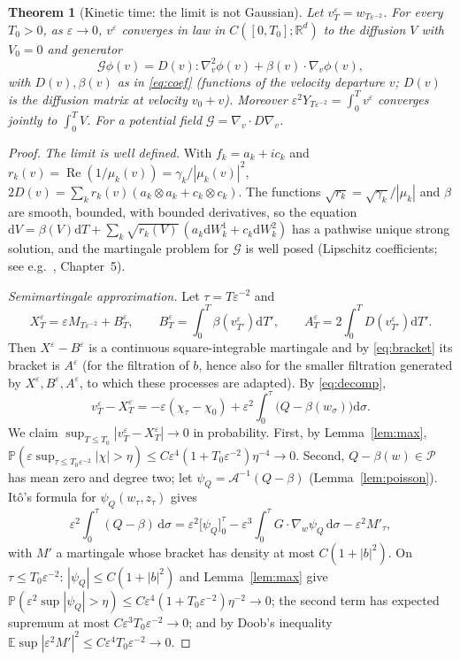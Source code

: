 \documentclass[11pt]{article}
\newcommand{\dd}{\mathrm{d}}
\newcommand{\E}{\mathbb{E}}
\newcommand{\eps}{\varepsilon}
\newcommand{\cA}{\mathcal{A}}
\newcommand{\cP}{\mathcal{P}}
\renewcommand{\Re}{\operatorname{Re}}
\newtheorem{theorem}{Theorem}
\theoremstyle{remark}
\begin{document}
\begin{theorem}[Kinetic time: the limit is not Gaussian]\label{thm:kinetic}
Let $v^\eps_T = w_{T\eps^{-2}}$. For every $T_0>0$, as $\eps\to0$, $v^\eps$
converges in law in $C([0,T_0];\mathbb{R}^d)$ to the diffusion $V$ with
$V_0=0$ and generator
\[
  \mathcal{G}\phi(v) = D(v):\nabla_v^2\phi(v) + \beta(v)\cdot\nabla_v\phi(v),
\]
with $D(v),\beta(v)$ as in \eqref{eq:coef} (functions of the velocity
departure $v$; $D(v)$ is the diffusion matrix at velocity $v_0+v$). Moreover
$\eps^2Y_{T\eps^{-2}} = \int_0^Tv^\eps$ converges jointly to $\int_0^TV$.
For a potential field $\mathcal{G} = \nabla_v\cdot D\nabla_v$.
\end{theorem}

\begin{proof}
\emph{The limit is well defined.} With $f_k = a_k + ic_k$ and
$r_k(v) = \Re(1/\mu_k(v)) = \gamma_k/|\mu_k(v)|^2$,
$2D(v) = \sum_kr_k(v)(a_k\otimes a_k + c_k\otimes c_k)$. The functions
$\sqrt{r_k} = \sqrt{\gamma_k}/|\mu_k|$ and $\beta$ are smooth, bounded, with
bounded derivatives, so the equation
$\dd V = \beta(V)\dd T + \sum_k\sqrt{r_k(V)}\,(a_k\dd W^1_k + c_k\dd W^2_k)$
has a pathwise unique strong solution, and the martingale problem for
$\mathcal{G}$ is well posed (Lipschitz coefficients; see e.g.\ \cite{EK},
Chapter~5).

\emph{Semimartingale approximation.} Let $\tau = T\eps^{-2}$ and
\[
  X^\eps_T = \eps M_{T\eps^{-2}} + B^\eps_T,\qquad
  B^\eps_T = \int_0^T\beta(v^\eps_{T'})\dd T',\qquad
  A^\eps_T = 2\int_0^TD(v^\eps_{T'})\dd T' .
\]
Then $X^\eps - B^\eps$ is a continuous square-integrable martingale and by
\eqref{eq:bracket} its bracket is $A^\eps$ (for the filtration of $b$, hence
also for the smaller filtration generated by $X^\eps,B^\eps,A^\eps$, to which
these processes are adapted). By \eqref{eq:decomp},
\[
  v^\eps_T - X^\eps_T = -\eps(\chi_\tau-\chi_0)
    + \eps^2\int_0^\tau\bigl(Q - \beta(w_\sigma)\bigr)\dd\sigma .
\]
We claim $\sup_{T\le T_0}|v^\eps_T - X^\eps_T|\to0$ in probability. First,
by Lemma~\ref{lem:max},
$\mathbb{P}(\eps\sup_{\tau\le T_0\eps^{-2}}|\chi|>\eta)
\le C\eps^4(1+T_0\eps^{-2})\eta^{-4}\to0$. Second, $Q-\beta(w)\in\cP$ has
mean zero and degree two; let $\psi_Q = \cA^{-1}(Q-\beta)$
(Lemma~\ref{lem:poisson}). It\^o's formula for $\psi_Q(w_\tau,z_\tau)$ gives
\[
  \eps^2\int_0^\tau(Q-\beta)\,\dd\sigma
  = \eps^2\bigl[\psi_Q\bigr]_0^\tau
    - \eps^3\int_0^\tau G\cdot\nabla_w\psi_Q\,\dd\sigma - \eps^2M'_\tau,
\]
with $M'$ a martingale whose bracket has density at most $C(1+|b|^2)$. On
$\tau\le T_0\eps^{-2}$: $|\psi_Q|\le C(1+|b|^2)$ and Lemma~\ref{lem:max} give
$\mathbb{P}(\eps^2\sup|\psi_Q|>\eta)\le C\eps^4(1+T_0\eps^{-2})\eta^{-2}\to0$;
the second term has expected supremum at most $C\eps^3T_0\eps^{-2}\to0$; and
by Doob's inequality $\E\sup|\eps^2M'|^2\le C\eps^4T_0\eps^{-2}\to0$.


\end{proof}
\end{document}
